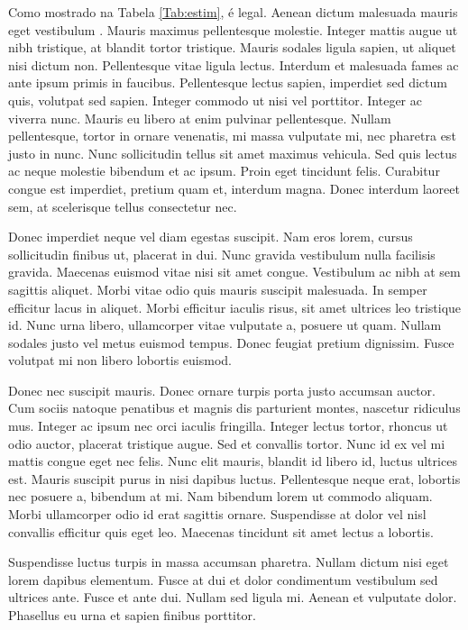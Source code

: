 \documentclass[book,A4paper,10pt,twoside,oldfontcommands]{memoir}\usepackage[]{graphicx}\usepackage[usenames,dvipsnames]{color}
\begin{document}
\begin{btUnit}
Como mostrado na Tabela \ref{Tab:estim}, é legal. Aenean dictum
malesuada mauris eget vestibulum \citep{Cockerham1996}. Mauris maximus
pellentesque molestie. Integer mattis augue ut nibh tristique, at
blandit tortor tristique. Mauris sodales ligula sapien, ut aliquet
nisi dictum non. Pellentesque vitae ligula lectus. Interdum et
malesuada fames ac ante ipsum primis in faucibus. Pellentesque lectus
sapien, imperdiet sed dictum quis, volutpat sed sapien. Integer
commodo ut nisi vel porttitor. Integer ac viverra nunc. Mauris eu
libero at enim pulvinar pellentesque. Nullam pellentesque, tortor in
ornare venenatis, mi massa vulputate mi, nec pharetra est justo in
nunc. Nunc sollicitudin tellus sit amet maximus vehicula. Sed quis
lectus ac neque molestie bibendum et ac ipsum. Proin eget tincidunt
felis. Curabitur congue est imperdiet, pretium quam et, interdum
magna. Donec interdum laoreet sem, at scelerisque tellus consectetur
nec.


Donec imperdiet neque vel diam egestas suscipit. Nam eros lorem,
cursus sollicitudin finibus ut, placerat in dui. Nunc gravida
vestibulum nulla facilisis gravida. Maecenas euismod vitae nisi sit
amet congue. Vestibulum ac nibh at sem sagittis aliquet. Morbi vitae
odio quis mauris suscipit malesuada. In semper efficitur lacus in
aliquet. Morbi efficitur iaculis risus, sit amet ultrices leo
tristique id. Nunc urna libero, ullamcorper vitae vulputate a, posuere
ut quam. Nullam sodales justo vel metus euismod tempus. Donec feugiat
pretium dignissim. Fusce volutpat mi non libero lobortis euismod.


Donec nec suscipit mauris. Donec ornare turpis porta justo accumsan
auctor. Cum sociis natoque penatibus et magnis dis parturient montes,
nascetur ridiculus mus. Integer ac ipsum nec orci iaculis fringilla.
Integer lectus tortor, rhoncus ut odio auctor, placerat tristique
augue. Sed et convallis tortor. Nunc id ex vel mi mattis congue eget
nec felis. Nunc elit mauris, blandit id libero id, luctus ultrices
est. Mauris suscipit purus in nisi dapibus luctus. Pellentesque neque
erat, lobortis nec posuere a, bibendum at mi. Nam bibendum lorem ut
commodo aliquam. Morbi ullamcorper odio id erat sagittis ornare.
Suspendisse at dolor vel nisl convallis efficitur quis eget leo.
Maecenas tincidunt sit amet lectus a lobortis.

Suspendisse luctus turpis in massa accumsan pharetra. Nullam dictum
nisi eget lorem dapibus elementum. Fusce at dui et dolor condimentum
vestibulum sed ultrices ante. Fusce et ante dui. Nullam sed ligula mi.
Aenean et vulputate dolor. Phasellus eu urna et sapien finibus
porttitor.



\end{btUnit}
\end{document}
